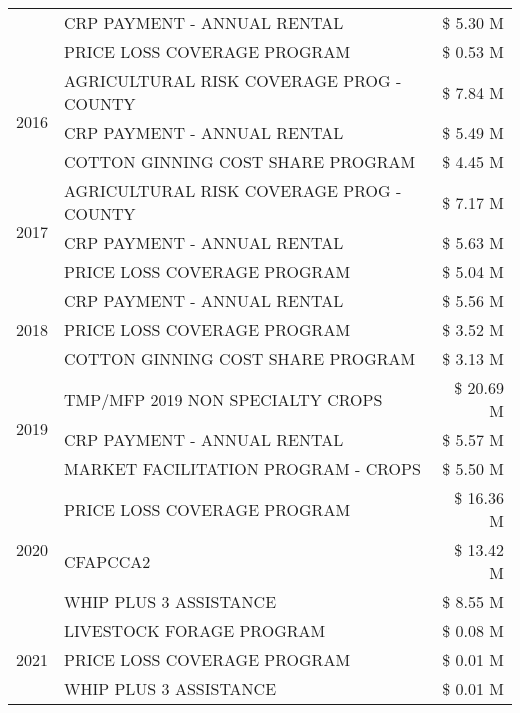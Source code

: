 \begin{tabular}{llr}
 & CRP PAYMENT - ANNUAL RENTAL & \$ 5.30 M \\
 & PRICE LOSS COVERAGE PROGRAM & \$ 0.53 M \\
\cline{1-3}
\multirow[t]{3}{*}{2016} & AGRICULTURAL RISK COVERAGE PROG - COUNTY & \$ 7.84 M \\
 & CRP PAYMENT - ANNUAL RENTAL & \$ 5.49 M \\
 & COTTON GINNING COST SHARE PROGRAM & \$ 4.45 M \\
\cline{1-3}
\multirow[t]{3}{*}{2017} & AGRICULTURAL RISK COVERAGE PROG - COUNTY & \$ 7.17 M \\
 & CRP PAYMENT - ANNUAL RENTAL & \$ 5.63 M \\
 & PRICE LOSS COVERAGE PROGRAM & \$ 5.04 M \\
\cline{1-3}
\multirow[t]{3}{*}{2018} & CRP PAYMENT - ANNUAL RENTAL & \$ 5.56 M \\
 & PRICE LOSS COVERAGE PROGRAM & \$ 3.52 M \\
 & COTTON GINNING COST SHARE PROGRAM & \$ 3.13 M \\
\cline{1-3}
\multirow[t]{3}{*}{2019} & TMP/MFP 2019 NON SPECIALTY CROPS & \$ 20.69 M \\
 & CRP PAYMENT - ANNUAL RENTAL & \$ 5.57 M \\
 & MARKET FACILITATION PROGRAM - CROPS & \$ 5.50 M \\
\cline{1-3}
\multirow[t]{3}{*}{2020} & PRICE LOSS COVERAGE PROGRAM & \$ 16.36 M \\
 & CFAPCCA2 & \$ 13.42 M \\
 & WHIP PLUS 3 ASSISTANCE & \$ 8.55 M \\
\cline{1-3}
\multirow[t]{3}{*}{2021} & LIVESTOCK FORAGE PROGRAM & \$ 0.08 M \\
 & PRICE LOSS COVERAGE PROGRAM & \$ 0.01 M \\
 & WHIP PLUS 3 ASSISTANCE & \$ 0.01 M \\
\cline{1-3}
\bottomrule
\end{tabular}
